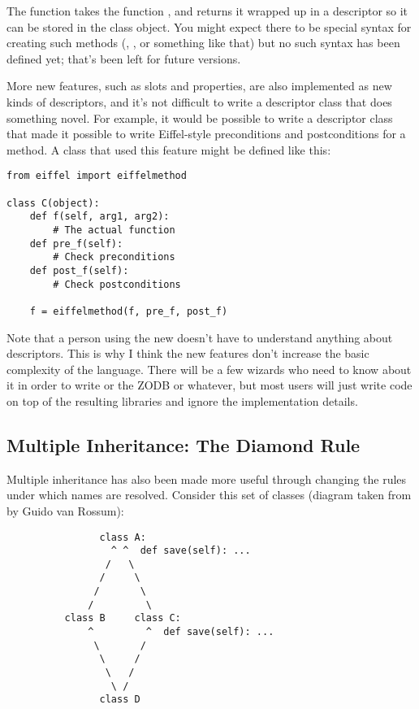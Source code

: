 \documentclass{howto}
\begin{document}
The  function takes the function
, and returns it wrapped up in a descriptor so it can be
stored in the class object.  You might expect there to be special
syntax for creating such methods (,
, or something like that) but no such syntax has
been defined yet; that's been left for future versions.

More new features, such as slots and properties, are also implemented
as new kinds of descriptors, and it's not difficult to write a
descriptor class that does something novel.  For example, it would be
possible to write a descriptor class that made it possible to write
Eiffel-style preconditions and postconditions for a method.  A class
that used this feature might be defined like this:

\begin{verbatim}
from eiffel import eiffelmethod

class C(object):
    def f(self, arg1, arg2):
        # The actual function
    def pre_f(self):
        # Check preconditions
    def post_f(self):
        # Check postconditions

    f = eiffelmethod(f, pre_f, post_f)
\end{verbatim}

Note that a person using the new  doesn't
have to understand anything about descriptors.  This is why I think
the new features don't increase the basic complexity of the language.
There will be a few wizards who need to know about it in order to
write  or the ZODB or whatever, but most
users will just write code on top of the resulting libraries and
ignore the implementation details.

\subsection{Multiple Inheritance: The Diamond Rule}

Multiple inheritance has also been made more useful through changing
the rules under which names are resolved.  Consider this set of classes
(diagram taken from  by Guido van Rossum):

\begin{verbatim}
                class A:
                  ^ ^  def save(self): ...
                 /   \
                /     \
               /       \
              /         \
          class B     class C:
              ^         ^  def save(self): ...
               \       /
                \     /
                 \   /
                  \ /
                class D
\end{verbatim}
\end{document}
